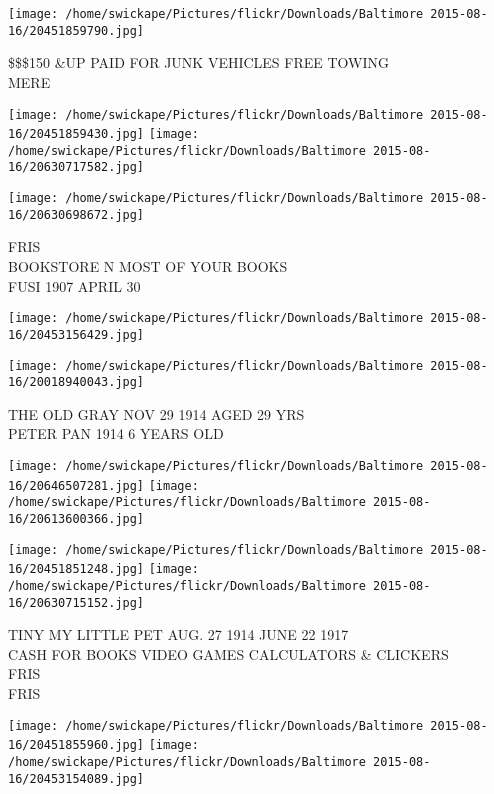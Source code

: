 \documentclass[10pt,letterpaper]{article}
\begin{document}
\vspace{0.25in}
\texttt{[image: /home/swickape/Pictures/flickr/Downloads/Baltimore 2015-08-16/20451859790.jpg]}

\$\$\$150 \&UP PAID FOR JUNK VEHICLES FREE TOWING\\
MERE\\
\pagebreak

\texttt{[image: /home/swickape/Pictures/flickr/Downloads/Baltimore 2015-08-16/20451859430.jpg]}
\texttt{[image: /home/swickape/Pictures/flickr/Downloads/Baltimore 2015-08-16/20630717582.jpg]}

\vspace{0.25in}
\texttt{[image: /home/swickape/Pictures/flickr/Downloads/Baltimore 2015-08-16/20630698672.jpg]}

FRIS\\
BOOKSTORE N MOST OF YOUR BOOKS\\
FUSI 1907 APRIL 30\\
\pagebreak

\texttt{[image: /home/swickape/Pictures/flickr/Downloads/Baltimore 2015-08-16/20453156429.jpg]}

\vspace{0.25in}
\texttt{[image: /home/swickape/Pictures/flickr/Downloads/Baltimore 2015-08-16/20018940043.jpg]}

THE OLD GRAY NOV 29 1914 AGED 29 YRS\\
PETER PAN 1914 6 YEARS OLD\\
\pagebreak

\texttt{[image: /home/swickape/Pictures/flickr/Downloads/Baltimore 2015-08-16/20646507281.jpg]}
\texttt{[image: /home/swickape/Pictures/flickr/Downloads/Baltimore 2015-08-16/20613600366.jpg]}

\texttt{[image: /home/swickape/Pictures/flickr/Downloads/Baltimore 2015-08-16/20451851248.jpg]}
\texttt{[image: /home/swickape/Pictures/flickr/Downloads/Baltimore 2015-08-16/20630715152.jpg]}

TINY MY LITTLE PET AUG. 27 1914 JUNE 22 1917\\
CASH FOR BOOKS VIDEO GAMES CALCULATORS \& CLICKERS\\
FRIS\\
FRIS\\
\pagebreak

\texttt{[image: /home/swickape/Pictures/flickr/Downloads/Baltimore 2015-08-16/20451855960.jpg]}
\texttt{[image: /home/swickape/Pictures/flickr/Downloads/Baltimore 2015-08-16/20453154089.jpg]}
\end{document}
